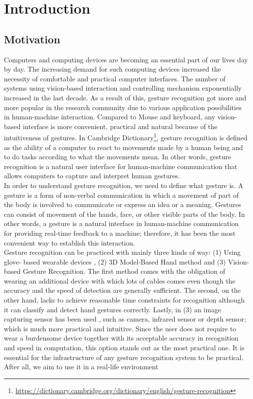 \chapter{Introduction}
\label{ch:introduction}

\section{Motivation}
\label{sec:motivation}
Computers and computing devices are becoming an essential part of our lives day by day.  The increasing demand for such computing devices increased the necessity of comfortable and practical computer interfaces.  The number of systems using vision-based interaction and controlling mechanism exponentially increased in the last decade.  As a result of this, gesture recognition got more and more popular in the research community due to various application possibilities in human-machine interaction. Compared to Mouse and keyboard, any vision-based interface is more convenient, practical and natural because of the intuitiveness of gestures.   In Cambridge  Dictionary\footnote{\url{https://dictionary.cambridge.org/dictionary/english/gesture-recognition}}, gesture recognition is defined as the ability of a computer to react to movements made by a human being and to do tasks according to what the movements mean.  In other words, gesture recognition is a natural user interface for human-machine communication that allows computers to capture and interpret human gestures.\\

In order to understand gesture recognition, we need to define what gesture is. A gesture is a form of non-verbal communication in which a movement of part of the body is involved to communicate or express an idea or a meaning.  Gestures can consist of movement of the hands,  face, or other visible parts of the body.  In other words, a gesture is a natural interface in human-machine communication for providing real-time feedback to a machine; therefore, it has been the most convenient way to establish this interaction.\\

Gesture recognition can be practiced with mainly three kinds of way:  (1) Using glove- based wearable devices \cite{abhishek_glove-based_2016}, (2)  3D Model-Based Hand method \cite{wen_intraoperative_2010}  and (3) Vision-based Gesture  Recognition.   The first method comes with the obligation of wearing an additional device with which lots of cables comes even though the accuracy and the speed of detection are generally sufficient.  The second, on the other hand, lacks to achieve reasonable time constraints for recognition although it can classify and detect hand gestures correctly.  Lastly, in (3) an image capturing sensor has been used , such as camera, infrared sensor or depth sensor; which is much more practical and intuitive. Since the user does not require to wear a burdensome device together with its acceptable accuracy in recognition and speed in computation, this option stands out as the most practical one.  It is essential for the infrastructure of any gesture recognition system to be practical.  After all, we aim to use it in a real-life environment\\

